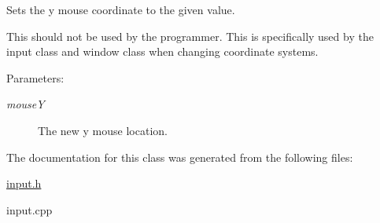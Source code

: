 Sets the y mouse coordinate to the given value. 

This should not be used by the programmer. This is specifically used by the input class and window class when changing coordinate systems. \begin{Desc}
\item[Parameters:]
\begin{description}
\item[{\em mouseY}]The new y mouse location. \end{description}
\end{Desc}


The documentation for this class was generated from the following files:\begin{CompactItemize}
\item 
\hyperlink{input_8h}{input.h}\item 
input.cpp\end{CompactItemize}
